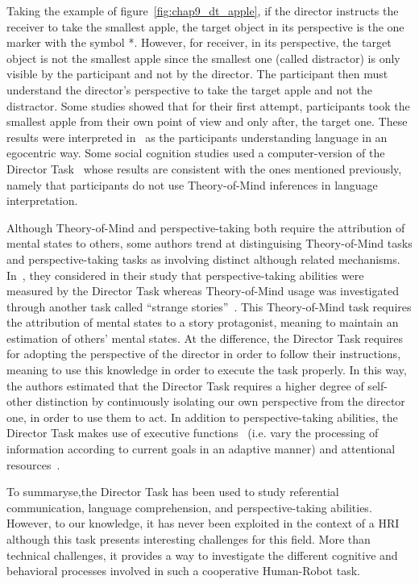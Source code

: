 Taking the example of figure~\ref{fig:chap9_dt_apple}, if the director instructs the receiver to take the smallest apple, the target object in its perspective is the one marker with the symbol *. However, for receiver, in its perspective, the target object is not the smallest apple since the smallest one (called distractor) is only visible by the participant and not by the director. The participant then must understand the director's perspective to take the target apple and not the distractor. Some studies showed that for their first attempt, participants took the smallest apple from their own point of view and only after, the target one. These results were interpreted in~\cite{keysar_1994_illusory, keysar_1998_egocentric, keysar_2002_self, keysar_2003_limits} as the participants understanding language in an egocentric way. Some social cognition studies used a computer-version of the Director Task~\cite{dumontheil_2010_online} whose results are consistent with the ones mentioned previously, namely that participants do not use Theory-of-Mind inferences in language interpretation.

Although Theory-of-Mind and perspective-taking both require the attribution of mental states to others, some authors trend at distinguising Theory-of-Mind tasks and perspective-taking tasks as involving distinct although related mechanisms. In~\cite{santiesteban_2012_training}, they considered in their study that perspective-taking abilities were measured by the Director Task whereas Theory-of-Mind usage was investigated through another task called ``strange stories''~\cite{happe_1994_advanced}. This Theory-of-Mind task requires the attribution of mental states to a story protagonist, meaning to maintain an estimation of others' mental states. At the difference, the Director Task requires for adopting the perspective of the director in order to follow their instructions, meaning to use this knowledge in order to execute the task properly. 
In this way, the authors estimated that the Director Task requires a higher degree of self-other distinction by continuously isolating our own perspective from the director one, in order to use them to act. In addition to perspective-taking abilities, the Director Task makes use of executive functions~\cite{rubio_2017_director} (i.e. vary the processing of information according to current goals in an adaptive manner) and attentional resources~\cite{lin_2010_reflexively}.

To summaryse,the Director Task has been used to study referential communication, language comprehension, and perspective-taking abilities. However, to our knowledge, it has never been exploited in the context of a HRI although this task presents interesting challenges for this field. More than technical challenges, it provides a way to investigate the different cognitive and behavioral processes involved in such a cooperative Human-Robot task.

